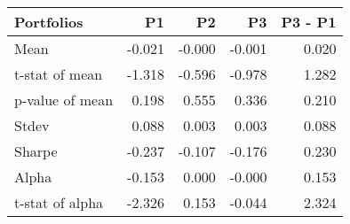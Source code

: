 \begin{tabular}{lrrrr}
\toprule
Portfolios & P1 & P2 & P3 & P3 - P1 \\
\midrule
Mean & -0.021 & -0.000 & -0.001 & 0.020 \\
t-stat of mean & -1.318 & -0.596 & -0.978 & 1.282 \\
p-value of mean & 0.198 & 0.555 & 0.336 & 0.210 \\
Stdev & 0.088 & 0.003 & 0.003 & 0.088 \\
Sharpe & -0.237 & -0.107 & -0.176 & 0.230 \\
Alpha & -0.153 & 0.000 & -0.000 & 0.153 \\
t-stat of alpha & -2.326 & 0.153 & -0.044 & 2.324 \\
\bottomrule
\end{tabular}
